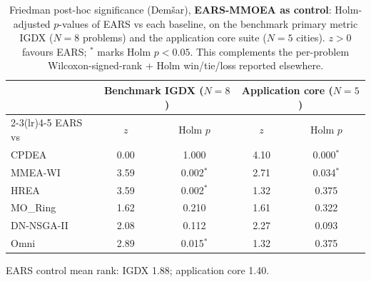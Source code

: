 \begin{table}[t]
\centering\small
\caption{Friedman post-hoc significance (Dem\v{s}ar), \textbf{EARS-MMOEA as control}: Holm-adjusted $p$-values of EARS vs each baseline, on the benchmark primary metric IGDX ($N{=}8$ problems) and the application core suite ($N{=}5$ cities). $z>0$ favours EARS; $^{*}$ marks Holm $p<0.05$. This complements the per-problem Wilcoxon-signed-rank + Holm win/tie/loss reported elsewhere.}
\label{tab:significance}
\begin{tabular}{lcc@{\quad}cc}
\toprule
& \multicolumn{2}{c}{Benchmark IGDX ($N{=}8$)} & \multicolumn{2}{c}{Application core ($N{=}5$)}\\
\cmidrule(lr){2-3}\cmidrule(lr){4-5}
EARS vs & $z$ & Holm $p$ & $z$ & Holm $p$ \\
\midrule
CPDEA & 0.00 & 1.000 & 4.10 & 0.000$^{*}$ \\
MMEA-WI & 3.59 & 0.002$^{*}$ & 2.71 & 0.034$^{*}$ \\
HREA & 3.59 & 0.002$^{*}$ & 1.32 & 0.375 \\
MO\_Ring & 1.62 & 0.210 & 1.61 & 0.322 \\
DN-NSGA-II & 2.08 & 0.112 & 2.27 & 0.093 \\
Omni & 2.89 & 0.015$^{*}$ & 1.32 & 0.375 \\
\bottomrule
\end{tabular}
\par\smallskip\footnotesize EARS control mean rank: IGDX 1.88; application core 1.40.
\end{table}
